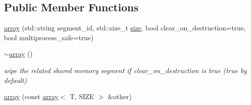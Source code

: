 \subsection*{Public Member Functions}
\begin{DoxyCompactItemize}
\item 
\hyperlink{classshared__memory_1_1array_a95b5abd158cb04ab0644f5aa6df48b2b}{array} (std\+::string segment\+\_\+id, std\+::size\+\_\+t \hyperlink{classshared__memory_1_1array_afc0dd0c59873934b082e524adb6bf2d7}{size}, bool clear\+\_\+on\+\_\+destruction=true, bool multiprocess\+\_\+safe=true)
\item 
\hyperlink{classshared__memory_1_1array_a45cad350fdb0170c955c8c367a9e910d}{$\sim$array} ()\hypertarget{classshared__memory_1_1array_a45cad350fdb0170c955c8c367a9e910d}{}\label{classshared__memory_1_1array_a45cad350fdb0170c955c8c367a9e910d}

\begin{DoxyCompactList}\small\item\em wipe the related shared memory segment if clear\+\_\+on\+\_\+destruction is true (true by default) \end{DoxyCompactList}\item 
\hyperlink{classshared__memory_1_1array_acde1531706ba2ab6c05d7639bc0f6f56}{array} (const \hyperlink{classshared__memory_1_1array}{array}$<$ T, S\+I\+ZE $>$ \&other)\hypertarget{classshared__memory_1_1array_acde1531706ba2ab6c05d7639bc0f6f56}{}\label{classshared__memory_1_1array_acde1531706ba2ab6c05d7639bc0f6f56}


\end{DoxyCompactItemize}
